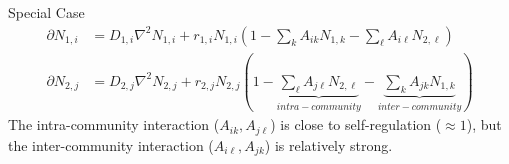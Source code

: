 \documentclass[aspectratio=169]{beamer}
\begin{document}
    \begin{frame}{Special Case}
        \begin{equation*}
            \begin{aligned}
                \partial N_{1,i} 
                & = D_{1,i} \nabla^2 N_{1,i} 
                + r_{1,i} N_{1,i} 
                \left( 
                     1 
                     - \sum_{k} A_{ik} N_{1,k} 
                     - \sum_{\ell} A_{i\ell} N_{2,\ell} 
                \right)\\
                \partial N_{2,j} 
                &= D_{2,j}\nabla^2 N_{2,j} 
                + r_{2,j} N_{2,j} 
                \left( 
                    1 
                    - \underbrace{\sum_{\ell} A_{j\ell} N_{2,\ell}}_{intra-community} 
                    - \underbrace{\sum_{k} A_{jk} N_{1,k}}_{inter-community} 
                \right)
            \end{aligned}
        \end{equation*}
        The intra-community interaction ($A_{ik}, A_{j\ell}$) is close to self-regulation ($\approx 1$), but the inter-community interaction ($A_{i\ell}, A_{jk}$) is relatively strong.
    \end{frame}
\end{document}

